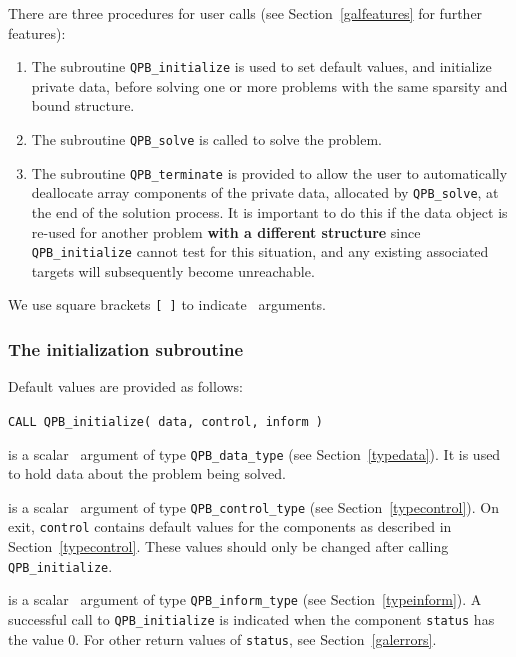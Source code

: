 \documentclass{galahad}
\newcommand{\packagename}{QPB}
\begin{document}

\galarguments
There are three procedures for user calls
(see Section~\ref{galfeatures} for further features): 

\begin{enumerate}
\item The subroutine 
      {\tt \packagename\_initialize} 
      is used to set default values, and initialize private data, 
      before solving one or more problems with the
      same sparsity and bound structure.
\item The subroutine 
      {\tt \packagename\_solve} 
      is called to solve the problem.
\item The subroutine 
      {\tt \packagename\_terminate} 
      is provided to allow the user to automatically deallocate array 
       components of the private data, allocated by 
       {\tt \packagename\_solve}, 
       at the end of the solution process. 
       It is important to do this if the data object is re-used for another 
       problem {\bf with a different structure}
       since {\tt \packagename\_initialize} cannot test for this situation, 
       and any existing associated targets will subsequently become unreachable.
\end{enumerate}
We use square brackets {\tt [ ]} to indicate \optional\ arguments.


\subsubsection{The initialization subroutine}\label{subinit}
 Default values are provided as follows:
\vspace*{1mm}

\hspace{8mm}
{\tt CALL \packagename\_initialize( data, control, inform )}

\vspace*{-3mm}
\begin{description}

 is a scalar \intentinout\ argument of type 
{\tt \packagename\_data\_type}
(see Section~\ref{typedata}). 
It is used to hold data about the problem being solved. 

 is a scalar \intentout\ argument of type 
{\tt \packagename\_control\_type}
(see Section~\ref{typecontrol}). 
On exit, {\tt control} contains default values for the components as
described in Section~\ref{typecontrol}.
These values should only be changed after calling 
{\tt \packagename\_initialize}.

 is a scalar \intentout\ argument of type 
{\tt \packagename\_inform\_type}
(see Section~\ref{typeinform}). A successful call to
{\tt \packagename\_initialize}
is indicated when the  component {\tt status} has the value 0. 
For other return values of {\tt status}, see Section~\ref{galerrors}.

\end{description}
\end{document}
